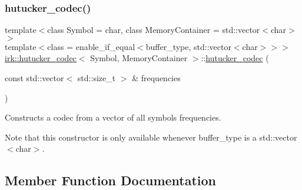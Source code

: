 \mbox{\label{classirk_1_1hutucker__codec_a41e575e3badde26ab126e10f15ce8315}} 
\subsubsection{\texorpdfstring{hutucker\+\_\+codec()}{hutucker\_codec()}\hspace{0.1cm}{\footnotesize\ttfamily [2/2]}}
{\footnotesize\ttfamily template$<$class Symbol  = char, class Memory\+Container  = std\+::vector$<$char$>$$>$ \\
template$<$class  = enable\+\_\+if\+\_\+equal$<$buffer\+\_\+type, std\+::vector$<$char$>$$>$$>$ \\
\mbox{\hyperlink{classirk_1_1hutucker__codec}{irk\+::hutucker\+\_\+codec}}$<$ Symbol, Memory\+Container $>$\+::\mbox{\hyperlink{classirk_1_1hutucker__codec}{hutucker\+\_\+codec}} (\begin{DoxyParamCaption}\item[{const std\+::vector$<$ std\+::size\+\_\+t $>$ \&}]{frequencies }\end{DoxyParamCaption})\hspace{0.3cm}{\ttfamily [inline]}}



Constructs a codec from a vector of all symbols\textquotesingle{} frequencies. 

Note that this constructor is only available whenever {\ttfamily buffer\+\_\+type} is a {\ttfamily std\+::vector$<$char$>$}. 

\subsection{Member Function Documentation}
\mbox{\label{classirk_1_1hutucker__codec_a4c5bc826a54ecf8cc9ce94b61396370f}} 
